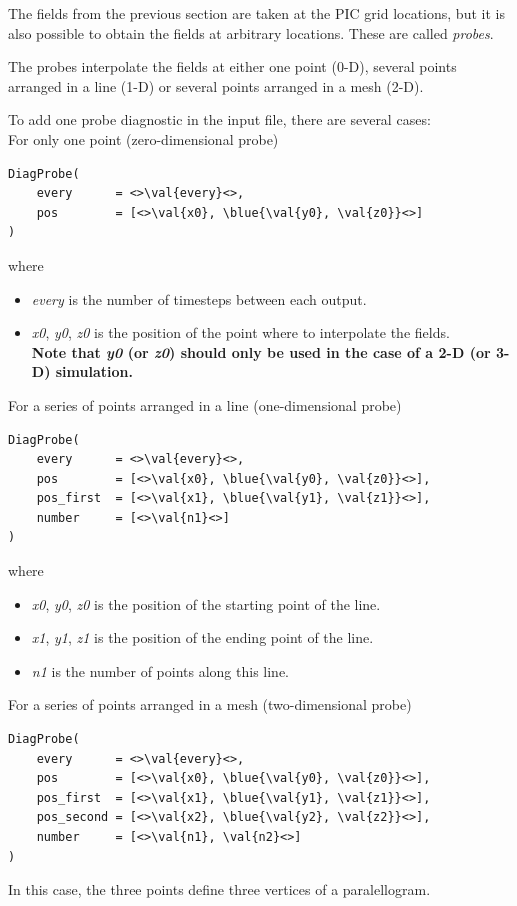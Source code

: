 \documentclass[11pt]{article}
\newcommand{\val}[1]{{\ttfamily \textit{#1}}}
\newcommand{\blue}[1]{{\color{blue} #1}}
\begin{document}
The fields from the previous section are taken at the PIC grid locations, but it is also possible to obtain
the fields at arbitrary locations. These are called \textit{probes}.

The probes interpolate the fields at either one point (0-D), several points arranged in a line (1-D) or several points arranged in a mesh (2-D).

To add one probe diagnostic in the input file, there are several cases:\\
For only one point (zero-dimensional probe)
\begin{lstlisting}
DiagProbe(
    every      = <>\val{every}<>,
    pos        = [<>\val{x0}, \blue{\val{y0}, \val{z0}}<>]
)
\end{lstlisting}\vspace{-10pt}
where\vspace{-10pt}
\begin{itemize}
\item \val{every} is the number of timesteps between each output.
\item \val{x0}, \val{y0}, \val{z0} is the position of the point where to interpolate the fields.\\
\textbf{Note that \val{y0} (or \val{z0}) should only be used in the case of a 2-D (or 3-D) simulation.}
\end{itemize}

For a series of points arranged in a line (one-dimensional probe)
\begin{lstlisting}
DiagProbe(
    every      = <>\val{every}<>,
    pos        = [<>\val{x0}, \blue{\val{y0}, \val{z0}}<>],
    pos_first  = [<>\val{x1}, \blue{\val{y1}, \val{z1}}<>],
    number     = [<>\val{n1}<>]
)
\end{lstlisting}\vspace{-10pt}
where\vspace{-10pt}
\begin{itemize}
\item \val{x0}, \val{y0}, \val{z0} is the position of the starting point of the line.
\item \val{x1}, \val{y1}, \val{z1} is the position of the ending point of the line.
\item \val{n1} is the number of points along this line.
\end{itemize}

For a series of points arranged in a mesh (two-dimensional probe)
\begin{lstlisting}
DiagProbe(
    every      = <>\val{every}<>,
    pos        = [<>\val{x0}, \blue{\val{y0}, \val{z0}}<>],
    pos_first  = [<>\val{x1}, \blue{\val{y1}, \val{z1}}<>],
    pos_second = [<>\val{x2}, \blue{\val{y2}, \val{z2}}<>],
    number     = [<>\val{n1}, \val{n2}<>]
)
\end{lstlisting}\vspace{-10pt}
In this case, the three points define three vertices of a paralellogram.
\end{document}

